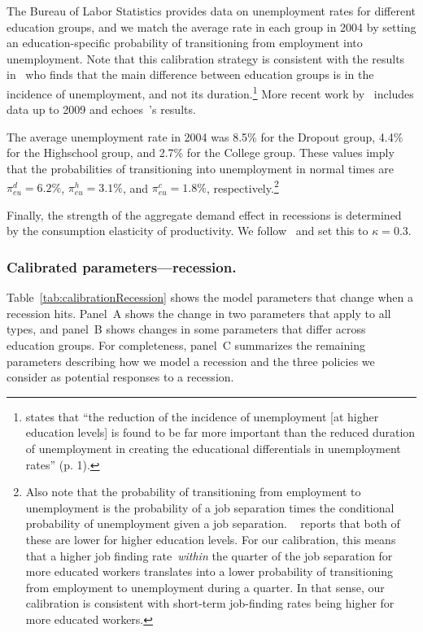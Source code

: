 \documentclass{econsocart}
\begin{document}
The Bureau of Labor Statistics provides data on unemployment rates for different education groups, and we match the average rate in each group in 2004 by setting an education-specific probability of transitioning from employment into unemployment.
Note that this calibration strategy is consistent with the results in~\cite{mincer1991education} who finds that the main difference between education groups is in the incidence of unemployment, and not its duration.\footnote{\cite{mincer1991education} states that ``the reduction of the incidence of unemployment [at higher education levels] is found to be far more important than the reduced duration of unemployment in creating the educational differentials in unemployment rates'' (p. 1).} More recent work by~\cite{elsby2010labor} includes data up to 2009 and echoes~\citeauthor{mincer1991education}'s results.

The average unemployment rate in 2004 was 8.5\% for the Dropout group, 4.4\% for the Highschool group, and 2.7\% for the College group.
These values imply that the probabilities of transitioning into unemployment in normal times are $\pi_{eu}^d=6.2\%$, $\pi_{eu}^h=3.1\%$, and $\pi_{eu}^c=1.8\%$, respectively.\footnote{Also note that the probability of transitioning from employment to unemployment is the probability of a job separation times the conditional probability of unemployment given a job separation.
  ~\cite{mincer1991education} reports that both of these are lower for higher education levels.
  For our calibration, this means that a higher job finding rate~\textit{within} the quarter of the job separation for more educated workers translates	into a lower probability of transitioning from employment to unemployment during a quarter.
  In that sense, our calibration is consistent with short-term job-finding rates being higher for more educated workers.}

Finally, the strength of the aggregate demand effect in recessions is determined by the consumption elasticity of productivity.
We follow~\cite{kmpHandbook} and set this to $\kappa=0.3$.

\subsubsection{Calibrated parameters---recession.}
\whenintegrated{\label{sec:calibRecession}}

Table~\ref{tab:calibrationRecession} shows the model parameters that change when a recession hits. Panel~A shows the change in two parameters that apply to all types, and panel~B shows changes in some parameters that differ across education groups. For completeness, panel~C summarizes the remaining parameters describing how we model a recession and the three policies we consider as potential responses to a recession.
\end{document}

